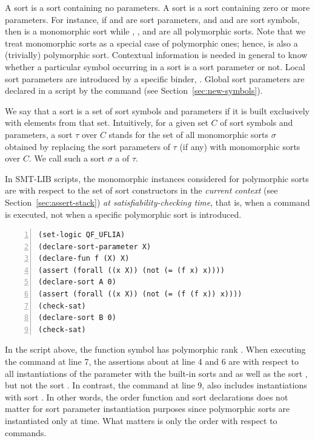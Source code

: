 A  sort is a sort containing no parameters.
A  sort is a sort containing zero or more parameters.
For instance, if  and  are sort parameters,
and  and  are sort symbols, 
then  is a monomorphic sort 
while , , and  are
all polymorphic sorts.
Note that we treat monomorphic sorts as a special case of polymorphic ones;
hence,  is also a (trivially) polymorphic sort.
Contextual information is needed in general to know whether a particular symbol
occurring in a sort is a sort parameter or not.
Local sort parameters are introduced by a specific binder, .
Global sort parameters are declared in a script by the command 
(see Section~\ref{sec:new-symbols}).

We say that a sort is  a set of sort symbols and parameters
if it is built exclusively with elements from that set.
Intuitively, for a given set $C$ of sort symbols and parameters,
a sort $\tau$ over $C$ stands for the set of all monomorphic sorts $\sigma$ obtained 
by replacing the sort parameters of $\tau$ (if any)
with monomorphic sorts over $C$.
We call such a sort $\sigma$ a  of $\tau$.

In SMT-LIB scripts, the monomorphic instances considered for polymorphic sorts are 
with respect to the set of sort constructors in the \emph{current context} 
(see Section~\ref{sec:assert-stack}) \emph{at satisfiability-checking time}, that is, 
when a  command is executed, not when a specific polymorphic sort 
is introduced.

\begin{lstlisting}[linewidth=35em,numbers=left]
(set-logic QF_UFLIA)
(declare-sort-parameter X)
(declare-fun f (X) X)
(assert (forall ((x X)) (not (= (f x) x))))
(declare-sort A 0)
(assert (forall ((x X)) (not (= (f (f x)) x))))
(check-sat)
(declare-sort B 0)
(check-sat)
\end{lstlisting}

In the script above, the function symbol  has polymorphic rank .
When executing the  command at line 7, 
the assertions about  at line 4 and 6 are with respect to all instantiations
of the parameter  with the built-in sorts  and 
as well as the sort , but not the sort .
In contrast, the  command at line 9, also includes
instantiations with sort .
In other words, the order function and sort declarations does not matter 
for sort parameter instantiation purposes 
since polymorphic sorts are instantiated only at  time.
What matters is only the order with respect to  commands.
\medskip

